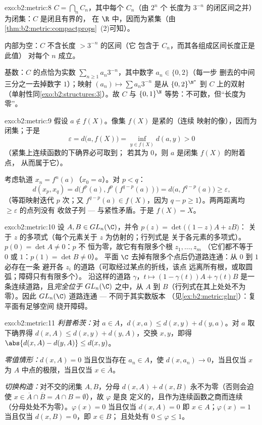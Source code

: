 \begin{solution}{exo:b2:metric:8}
$C = \bigcap_n C_n$，其中每个 $C_n$（由 $2^n$ 个
长度为 $3^{-n}$ 的闭区间之并）为闭集：$C$ 是闭且有界的，
在 $\R$ 中，因而为紧集（由\cref{thm:b2:metric:compactprops}~(2)可知）。

内部为空：$C$ 不含长度 $> 3^{-n}$ 的区间（它
包含于 $C_n$，而其各组成区间长度正是此值）
对每个 $n$ 成立。

基数：$C$ 的点恰为实数 $\sum_{n\geq1}
a_n 3^{-n}$，其中数字 $a_n \in \{0, 2\}$（每一步
删去的中间三分之一去掉数字 $1$）；映射 $(a_n) \mapsto
\sum a_n 3^{-n}$ 是从 $\{0,2\}^{\N^*}$ 到 $C$ 上的双射
（单射性同\cref{exo:b2:structures:3}）。故 $C$ 与
$\{0,1\}^{\N}$ 等势：不可数，但“长度为零”。
\end{solution}

\begin{solution}{exo:b2:metric:9}
假设 $a \notin f(X)$。像集 $f(X)$ 是紧的（连续
映射的像），因而为闭集；于是
\[
\varepsilon = d\bigl(a, f(X)\bigr)
= \inf_{y \in f(X)} d(a, y) > 0
\]
（紧集上连续函数的下确界必可取到；
若其为 $0$，则 $a$ 是闭集 $f(X)$ 的附着点，
从而属于它）。

考虑轨道 $x_n = f^n(a)$（$x_0 = a$）。对 $p < q$：
\[
d(x_p, x_q) = d\bigl(f^p(a), f^p(f^{q-p}(a))\bigr)
= d\bigl(a, f^{q-p}(a)\bigr) \geq \varepsilon,
\]
（等距映射迭代 $p$ 次；又 $f^{q-p}(a) \in f(X)$，因为 $q - p
\geq 1$）。两两距离均 $\geq \varepsilon$ 的点列没有
收敛子列 --- 与紧性矛盾。于是 $f(X) =
X$。
\end{solution}

\begin{solution}{exo:b2:metric:10}
设 $A, B \in GL_n(\C)$，并令 $p(z) = \det\bigl((1-z)A + zB\bigr)$：
关于 $z$ 的多项式（每个元素关于 $z$ 为仿射的；行列式是
关于各元素的多项式）。$p(0) = \det A \neq 0$：$p$ 不
恒为零，故它有有限多个根 $z_1, \dots, z_m$
（它们都不等于 $0$ 或 $1$：$p(1) = \det B \neq 0$）。
平面 $\C$ 去掉有限多个点后仍道路连通：从 $0$ 到 $1$ 必存在一条
避开各 $z_i$ 的道路（可取经过某点的折线，该点
远离所有根，或取圆弧；障碍只有有限多个）。
沿这样的道路 $\gamma$，$t \mapsto (1 - \gamma(t))A +
\gamma(t)B$ 是一条连续道路，且\emph{完全位于} $GL_n(\C)$ 之中，从 $A$
到 $B$（行列式在其上处处不为零）。因此 $GL_n(\C)$
道路连通 --- 不同于其实数版本
（见\cref{ex:b2:metric:glnr}）：复平面有足够空间
绕开障碍。
\end{solution}

\begin{solution}{exo:b2:metric:11}
\emph{利普希茨：}对 $a \in A$，$d(x, a) \leq d(x, y) + d(y,
a)$。对 $a$ 取下确界得 $d(x, A) \leq d(x, y) + d(y,
A)$，交换 $x, y$，即得 $\abs{d(x,A) - d(y,A)} \leq d(x,y)$。

\emph{零值情形：}$d(x, A) = 0$ 当且仅当存在 $a_n \in A$，使
$d(x, a_n) \to 0$，当且仅当 $x$ 为 $A$ 中点的极限，当且仅当 $x \in
\overline A$。

\emph{切换构造：}对不交的闭集 $A, B$，分母
$d(x,A) + d(x,B)$ 永不为零（否则会迫使 $x \in \overline
A \cap \overline B = A \cap B = \emptyset$），故 $\varphi$ 是良
定义的，且作为连续函数之商而连续
（分母处处不为零）。$\varphi(x) = 0$ 当且仅当 $d(x, A) = 0$
即 $x \in A$；$\varphi(x) = 1$ 当且仅当 $d(x, B) = 0$，即 $x \in B$；
且处处有 $0 \leq \varphi \leq 1$。
\end{solution}

